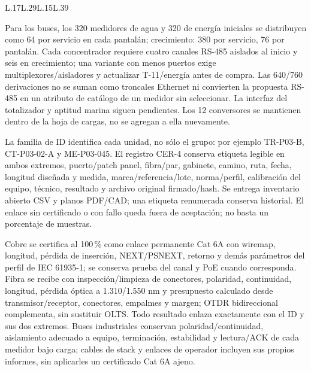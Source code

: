 \begin{paginaHorizontalSynaptix}
\begin{longtable}{L{\dimexpr.17\tabcolsep\relax}L{\dimexpr.29\tabcolsep\relax}L{\dimexpr.15\tabcolsep\relax}L{\dimexpr.39\tabcolsep\relax}}
\end{longtable}
\endgroup
\end{paginaHorizontalSynaptix}

Para los buses, los 320 medidores de agua y 320 de energía iniciales se distribuyen como 64 por servicio en cada pantalán; crecimiento: 380 por servicio, 76 por pantalán. Cada concentrador requiere cuatro canales RS-485 aislados al inicio y seis en crecimiento; una variante con menos puertos exige multiplexores/aisladores y actualizar T-11/energía antes de compra. Las 640/760 derivaciones no se suman como troncales Ethernet ni convierten la propuesta RS-485 en un atributo de catálogo de un medidor sin seleccionar. La interfaz del totalizador y aptitud marina siguen pendientes. Los 12 conversores se mantienen dentro de la hoja de cargas, no se agregan a ella nuevamente.

La familia de ID identifica cada unidad, no sólo el grupo: por ejemplo TR-P03-B, CT-P03-02-A y ME-P03-045. El registro CER-4 conserva etiqueta legible en ambos extremos, puerto/patch panel, fibra/par, gabinete, camino, ruta, fecha, longitud diseñada y medida, marca/referencia/lote, norma/perfil, calibración del equipo, técnico, resultado y archivo original firmado/hash. Se entrega inventario abierto CSV y planos PDF/CAD; una etiqueta renumerada conserva historial. El enlace sin certificado o con fallo queda fuera de aceptación; no basta un porcentaje de muestras.

Cobre se certifica al 100\,\% como enlace permanente Cat 6A con wiremap, longitud, pérdida de inserción, NEXT/PSNEXT, retorno y demás parámetros del perfil de IEC 61935-1; se conserva prueba del canal y PoE cuando corresponda. Fibra se recibe con inspección/limpieza de conectores, polaridad, continuidad, longitud, pérdida óptica a 1.310/1.550 nm y presupuesto calculado desde transmisor/receptor, conectores, empalmes y margen; OTDR bidireccional complementa, sin sustituir OLTS. Todo resultado enlaza exactamente con el ID y sus dos extremos. Buses industriales conservan polaridad/continuidad, aislamiento adecuado a equipo, terminación, estabilidad y lectura/ACK de cada medidor bajo carga; cables de stack y enlaces de operador incluyen sus propios informes, sin aplicarles un certificado Cat 6A ajeno.

